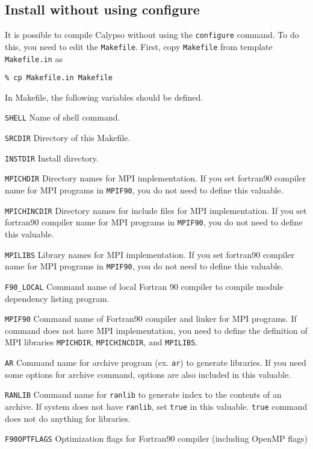 \subsection{Install without using configure}
\label{section:no_configure}
It is possible to compile Calypso without using the \verb|configure| command. To do this, you need to edit the \verb|Makefile|. First, copy \verb|Makefile| from template \verb|Makefile.in| as
%
\begin{verbatim}
% cp Makefile.in Makefile
\end{verbatim}
In Makefile, the following variables should be defined.
%
\begin{description}
\item{\verb|SHELL|}    Name of shell command.
\item{\verb|SRCDIR|}   Directory of this Makefile. 
\item{\verb|INSTDIR|}  Install directory.
\item{\verb|MPICHDIR|} Directory names for MPI implementation. If you set fortran90 compiler name for MPI programs in \verb|MPIF90|, you do not need to define this valuable.
\item{\verb|MPICHINCDIR|} Directory names for include files for MPI implementation. If you set fortran90 compiler name for MPI programs in \verb|MPIF90|, you do not need to define this valuable.
\item{\verb|MPILIBS|}   Library names for MPI implementation. If you set fortran90 compiler name for MPI programs in \verb|MPIF90|, you do not need to define this valuable.
\item{\verb|F90_LOCAL|} Command name of local Fortran 90 compiler to compile module dependency listing program.
\item{\verb|MPIF90|} Command name of Fortran90 compiler and linker for MPI programs. If command does not have MPI implementation, you need to define the definition of MPI libraries \verb|MPICHDIR|, \verb|MPICHINCDIR|, and \verb|MPILIBS|.
\item{\verb|AR|}     Command name for archive program (ex. \verb|ar|) to generate libraries. If you need some options for archive command, options are also included in this valuable.
\item{\verb|RANLIB|} Command name for \verb|ranlib| to generate index to the contents of an archive. If system does not have \verb|ranlib|, set \verb|true| in this valuable. \verb|true| command does not do anything for libraries.
\item{}
\item{\verb|F90OPTFLAGS|}  Optimization flags for Fortran90 compiler (including OpenMP flags)

\end{description}
